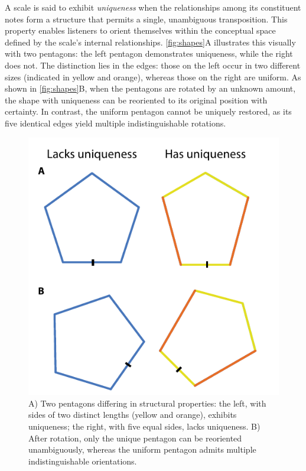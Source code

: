 \documentclass[10pt,twocolumn]{article}
\numberwithin{equation}{section} %
\begin{document}
    A scale is said to exhibit \textit{uniqueness} when the relationships among its constituent notes form a structure that permits a single, unambiguous transposition.
    This property enables listeners to orient themselves within the conceptual space defined by the scale's internal relationships.
    \autoref{fig:shapes}A illustrates this visually with two pentagons: the left pentagon demonstrates uniqueness, while the right does not.
    The distinction lies in the edges: those on the left occur in two different sizes (indicated in yellow and orange), whereas those on the right are uniform.
    As shown in \autoref{fig:shapes}B, when the pentagons are rotated by an unknown amount, the shape with uniqueness can be reoriented to its original position with certainty.
    In contrast, the uniform pentagon cannot be uniquely restored, as its five identical edges yield multiple indistinguishable rotations.

    \begin{figure}[htbp]
        \centering
        \includegraphics[width=\linewidth]{figures/two-shapes}%
        \caption{A) Two pentagons differing in structural properties: the left, with sides of two distinct lengths (yellow and orange), exhibits uniqueness; the right, with five equal sides, lacks uniqueness.
B) After rotation, only the unique pentagon can be reoriented unambiguously, whereas the uniform pentagon admits multiple indistinguishable orientations.}
        \label{fig:shapes}
    \end{figure}
\end{document}
